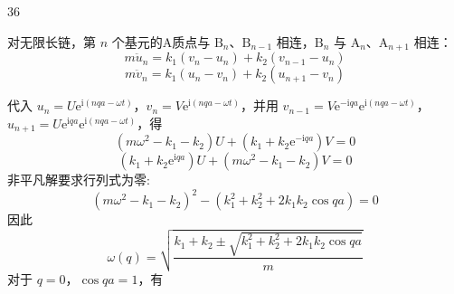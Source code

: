 \begin{solution}{36}
    \begin{subsolution}
        \begin{subsubsolution}
            对无限长链，第 $n$ 个基元的A质点与 $\mathrm{B}_n$、$\mathrm{B}_{n - 1}$ 相连，$\mathrm{B}_n$ 与 $\mathrm{A}_n$、$\mathrm{A}_{n + 1}$ 相连：
            \begin{equation}
                m \ddot {u} _ {n} = k _ {1} (v _ {n} - u _ {n}) + k _ {2} (v _ {n - 1} - u _ {n})
                \label{eq:1.s36}
            \end{equation}
            \begin{equation}
                m \ddot {v} _ {n} = k _ {1} (u _ {n} - v _ {n}) + k _ {2} (u _ {n + 1} - v _ {n})
                \label{eq:2.s36}
            \end{equation}
        \end{subsubsolution}
        \begin{subsubsolution}
            代入 $u_{n} = U\mathrm{e}^{\mathrm{i}(nqa - \omega t)}$，$v_{n} = V\mathrm{e}^{\mathrm{i}(nqa - \omega t)}$，并用 $v_{n-1} = V\mathrm{e}^{-\mathrm{i}qa}\mathrm{e}^{\mathrm{i}(nqa - \omega t)}$，$u_{n+1} = U\mathrm{e}^{\mathrm{i}qa}\mathrm{e}^{\mathrm{i}(nqa - \omega t)}$，得
            \begin{equation}
                (m \omega^ {2} - k _ {1} - k _ {2}) U + (k _ {1} + k _ {2} \mathrm{e} ^ {- \mathrm{i} q a}) V = 0
                \label{eq:3.s36}
            \end{equation}
            \begin{equation}
                (k _ {1} + k _ {2} \mathrm{e} ^ {\mathrm{i} q a}) U + (m \omega^ {2} - k _ {1} - k _ {2}) V = 0
                \label{eq:4.s36}
            \end{equation}
            非平凡解要求行列式为零:
            \begin{equation}
                (m \omega^ {2} - k _ {1} - k _ {2}) ^ {2} - (k _ {1} ^ {2} + k _ {2} ^ {2} + 2 k _ {1} k _ {2} \cos q a) = 0
                \label{eq:5.s36}
            \end{equation}
            因此
            \begin{equation}
                \omega (q) = \sqrt {\frac {k _ {1} + k _ {2} \pm \sqrt {k _ {1} ^ {2} + k _ {2} ^ {2} + 2 k _ {1} k _ {2} \cos q a}}{m}}
                \label{eq:6.s36}
            \end{equation}
            对于 $q = 0$，$\cos qa = 1$，有
            \begin{equation}

\end{equation}
\end{subsubsolution}
\end{subsolution}
\end{solution}

